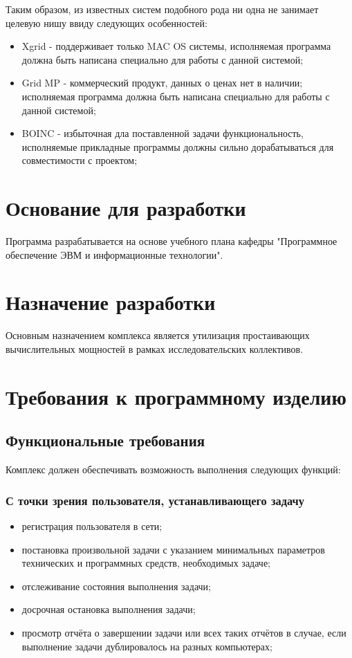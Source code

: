 \documentclass[a4paper,12pt]{report}
\numberwithin{equation}{section}
\begin{document}
Таким образом, из известных систем подобного рода ни одна не занимает целевую нишу ввиду следующих особенностей: 
\begin{itemize}
  \item Xgrid - поддерживает только MAC OS системы, исполняемая программа должна быть написана специально для работы с данной системой;
  \item Grid MP - коммерческий продукт, данных о ценах нет в наличии; исполняемая программа должна быть написана специально для работы с данной системой;
  \item BOINC - избыточная дла поставленной задачи функциональность, исполняемые прикладные программы должны сильно дорабатываться для совместимости с проектом;
\end{itemize}

\section{Основание для разработки}
Программа разрабатывается на основе учебного плана кафедры "Программное обеспечение ЭВМ и информационные технологии".

\section{Назначение разработки}
Основным назначением комплекса является утилизация простаивающих вычислительных мощностей в рамках исследовательских коллективов.

\clearpage
\section{Требования к программному изделию}
\subsection{Функциональные требования}
Комплекс должен обеспечивать возможность выполнения следующих функций:
\subsubsection{С точки зрения пользователя, устанавливающего задачу}
\begin{itemize}
  \item регистрация пользователя в сети;
  \item постановка произвольной задачи с указанием минимальных параметров технических и программных средств, необходимых задаче;
  \item отслеживание состояния выполнения задачи;
  \item досрочная остановка выполнения задачи;
  \item просмотр отчёта о завершении задачи или всех таких отчётов в случае, если выполнение задачи дублировалось на разных компьютерах;
\end{itemize}
\end{document}
